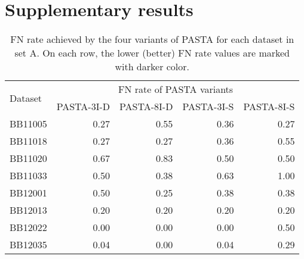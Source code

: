 \section{Supplementary results}
\label{sec:result_balibase}

\begin{table}[htbp]
	\centering
	\small
	\caption{FN rate achieved by the four variants of PASTA for each dataset in set A. On each row, the lower (better) FN rate values are marked with darker color.}
	\begin{tabular}{|l|r|r|r|r|}
		\hline
		\multirow{2}{*}{Dataset} & \multicolumn{4}{c|}{FN rate of PASTA variants } \\
		\cline{2-5}          & \multicolumn{1}{l|}{PASTA-3I-D} & \multicolumn{1}{l|}{PASTA-8I-D} & \multicolumn{1}{l|}{PASTA-3I-S} & \multicolumn{1}{l|}{PASTA-8I-S} \\
		\hline
		BB11005 & \cellcolor[rgb]{ .384,  .745,  .478}0.27 & \cellcolor[rgb]{ .988,  1,  .992}0.55 & \cellcolor[rgb]{ .584,  .827,  .647}0.36 & \cellcolor[rgb]{ .384,  .745,  .478}0.27 \\
		\hline
		BB11018 & \cellcolor[rgb]{ .384,  .745,  .478}0.27 & \cellcolor[rgb]{ .384,  .745,  .478}0.27 & \cellcolor[rgb]{ .584,  .827,  .647}0.36 & \cellcolor[rgb]{ .988,  1,  .992}0.55 \\
		\hline
		BB11020 & \cellcolor[rgb]{ .686,  .871,  .733}0.67 & \cellcolor[rgb]{ .988,  1,  .992}0.83 & \cellcolor[rgb]{ .384,  .745,  .478}0.50 & \cellcolor[rgb]{ .384,  .745,  .478}0.50 \\
		\hline
		BB11033 & \cellcolor[rgb]{ .502,  .796,  .58}0.50 & \cellcolor[rgb]{ .384,  .745,  .478}0.38 & \cellcolor[rgb]{ .624,  .847,  .682}0.63 & \cellcolor[rgb]{ .988,  1,  .992}1.00 \\
		\hline
		BB12001 & \cellcolor[rgb]{ .988,  1,  .992}0.50 & \cellcolor[rgb]{ .384,  .745,  .478}0.25 & \cellcolor[rgb]{ .686,  .871,  .733}0.38 & \cellcolor[rgb]{ .686,  .871,  .733}0.38 \\
		\hline
		BB12013 & \cellcolor[rgb]{ .988,  1,  .992}0.20 & \cellcolor[rgb]{ .988,  1,  .992}0.20 & \cellcolor[rgb]{ .988,  1,  .992}0.20 & \cellcolor[rgb]{ .988,  1,  .992}0.20 \\
		\hline
		BB12022 & \cellcolor[rgb]{ .384,  .745,  .478}0.00 & \cellcolor[rgb]{ .384,  .745,  .478}0.00 & \cellcolor[rgb]{ .384,  .745,  .478}0.00 & \cellcolor[rgb]{ .988,  1,  .992}0.50 \\
		\hline
		BB12035 & \cellcolor[rgb]{ .467,  .78,  .549}0.04 & \cellcolor[rgb]{ .384,  .745,  .478}0.00 & \cellcolor[rgb]{ .467,  .78,  .549}0.04 & \cellcolor[rgb]{ .988,  1,  .992}0.29 \\

\end{tabular}
\end{table}
